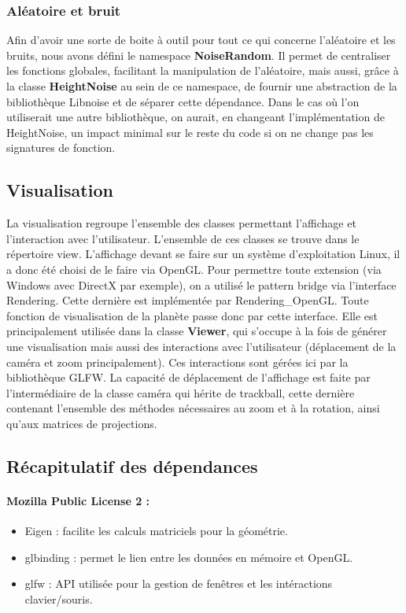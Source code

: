 \documentclass[a4paper]{article}
\begin{document}
\newpage
\subsubsection{Aléatoire et bruit}

Afin d'avoir une sorte de boite à outil pour tout ce qui concerne l'aléatoire et les bruits, nous avons défini le namespace \textbf{NoiseRandom}. Il permet de centraliser les fonctions globales, facilitant la manipulation de l'aléatoire, mais aussi, grâce à la classe \textbf{HeightNoise} au sein de ce namespace, de fournir une abstraction de la bibliothèque Libnoise et de séparer cette dépendance. Dans le cas où l'on utiliserait une autre bibliothèque, on aurait, en changeant l'implémentation de HeightNoise, un impact minimal sur le reste du code si on ne change pas les signatures de fonction.

\subsection{Visualisation}


La visualisation regroupe l'ensemble des classes permettant l'affichage et l'interaction avec l'utilisateur. L'ensemble de ces classes se trouve dans le répertoire view.
L'affichage devant se faire sur un système d'exploitation Linux, il a donc été choisi de le faire via OpenGL. Pour permettre toute extension (via Windows avec DirectX par exemple), on a utilisé le pattern bridge via l'interface Rendering. Cette dernière est implémentée par Rendering\_OpenGL. Toute fonction de visualisation de la planète passe donc par cette interface. Elle est principalement utilisée dans la classe \textbf{Viewer}, qui s'occupe à la fois de générer une visualisation mais aussi des interactions avec l'utilisateur (déplacement de la caméra et zoom principalement). Ces interactions sont gérées ici par la bibliothèque GLFW.
La capacité de déplacement de l'affichage est faite par l'intermédiaire de la classe caméra qui hérite de trackball, cette dernière contenant l'ensemble des méthodes nécessaires au zoom et à la rotation, ainsi qu'aux matrices de projections.

\subsection{Récapitulatif des dépendances}

\paragraph{Mozilla Public License 2 : }
\begin{itemize}
\item Eigen :  
     facilite les calculs matriciels pour la géométrie. 
 \item glbinding :  
     permet le lien entre les données en mémoire et OpenGL.
\item glfw : 
     API utilisée pour la gestion de fenêtres et les intéractions clavier/souris.
\end{itemize}
\end{document}
